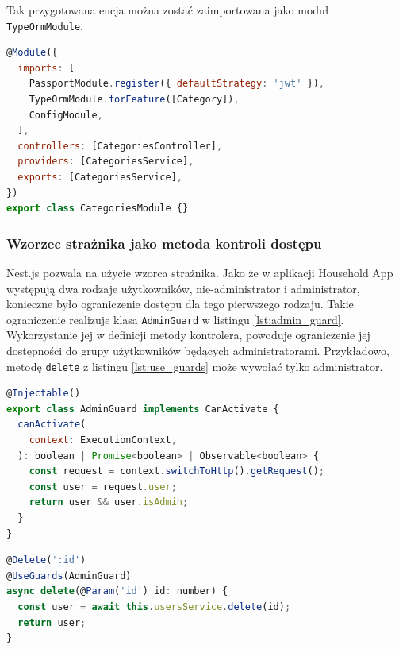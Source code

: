 Tak przygotowana encja można zostać zaimportowana jako moduł \lstinline{TypeOrmModule}.

\begin{lstlisting}[language=JavaScript, caption={Moduł \lstinline{CategoriesModule}.}, label=lst:entity_module]
@Module({
  imports: [
    PassportModule.register({ defaultStrategy: 'jwt' }),
    TypeOrmModule.forFeature([Category]),
    ConfigModule,
  ],
  controllers: [CategoriesController],
  providers: [CategoriesService],
  exports: [CategoriesService],
})
export class CategoriesModule {}
\end{lstlisting}


\subsubsection{Wzorzec strażnika jako metoda kontroli dostępu}
Nest.js pozwala na użycie wzorca strażnika. Jako że w aplikacji Household App występują dwa rodzaje użytkowników, nie-administrator i administrator, konieczne było ograniczenie dostępu dla tego pierwszego rodzaju. Takie ograniczenie realizuje klasa \lstinline{AdminGuard} w listingu \ref{lst:admin_guard}. Wykorzystanie jej w definicji metody kontrolera, powoduje ograniczenie jej dostępności do grupy użytkowników będących administratorami. Przykładowo, metodę \lstinline{delete} z listingu \ref{lst:use_guards} może wywołać tylko administrator.  

\begin{lstlisting}[language=JavaScript, caption={Klasa \lstinline{AdminGuard}.}, label=lst:admin_guard]
@Injectable()
export class AdminGuard implements CanActivate {
  canActivate(
    context: ExecutionContext,
  ): boolean | Promise<boolean> | Observable<boolean> {
    const request = context.switchToHttp().getRequest();
    const user = request.user;
    return user && user.isAdmin;
  }
}
\end{lstlisting}

\begin{lstlisting}[language=JavaScript, caption={Użycie strażnika \lstinline{AdminGuard}.}, label=lst:use_guards]
@Delete(':id')
@UseGuards(AdminGuard)
async delete(@Param('id') id: number) {
  const user = await this.usersService.delete(id);
  return user;
}
\end{lstlisting}


